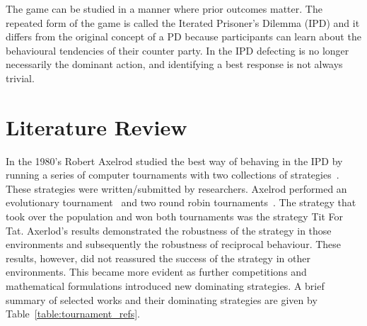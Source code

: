The game can be studied in a manner where prior outcomes matter. The repeated
form of the game is called the Iterated Prisoner's Dilemma (IPD) and it differs
from the original concept of a PD because participants can learn about the
behavioural tendencies of their counter party. In the IPD defecting is no
longer necessarily the dominant action, and identifying a best response is not
always trivial.

\section{Literature Review}\label{section:introduction_brief_literature}

In the 1980's Robert Axelrod studied the best way of behaving in the IPD by
running a series of computer tournaments with two collections of
strategies~\cite{Axelrod1984}. These strategies were written/submitted by
researchers. Axelrod performed an evolutionary tournament~\cite{Axelrod1981} and
two round robin tournaments~\cite{Axelrod1980a, Axelrod1980b}. The strategy that
took over the population and won both tournaments was the strategy Tit For Tat.
Axerlod's results demonstrated the robustness of the strategy in those
environments and subsequently the robustness of reciprocal behaviour. These
results, however, did not reassured the success of the strategy in other
environments. This became more evident as further competitions and mathematical
formulations introduced new dominating strategies. A
brief summary of selected works and their dominating strategies are given by
Table~\ref{table:tournament_refs}.

